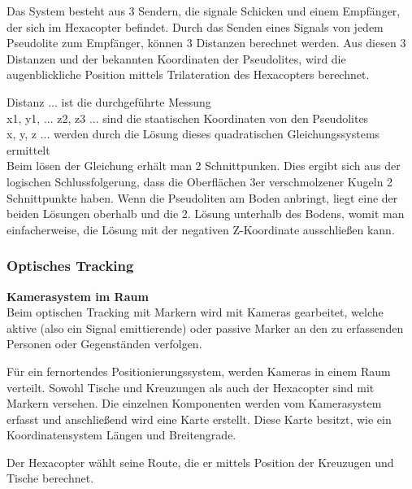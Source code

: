       Das System besteht aus 3 Sendern, die signale Schicken und einem Empfänger, der sich im Hexacopter befindet.
      Durch das Senden eines Signals von jedem Pseudolite zum Empfänger, können 3 Distanzen berechnet werden.
      Aus diesen 3 Distanzen und der bekannten Koordinaten der Pseudolites, wird die augenblickliche Position mittels Trilateration des Hexacopters berechnet.


      Distanz ... ist die durchgeführte Messung\\
      x1, y1, ... z2, z3 ... sind die staatischen Koordinaten von den Pseudolites \\
      x, y, z ... werden durch die Lösung dieses quadratischen Gleichungssystems ermittelt \\

      Beim lösen der Gleichung erhält man 2 Schnittpunken. Dies ergibt sich aus der logischen Schlussfolgerung, dass die Oberflächen 3er verschmolzener Kugeln 2 Schnittpunkte haben.
      Wenn die Pseudoliten am Boden anbringt, liegt eine der beiden Lösungen oberhalb und die 2. Lösung unterhalb des Bodens, womit man einfacherweise, die Lösung mit der negativen Z-Koordinate ausschließen kann.

    \subsubsection{Optisches Tracking}

  \textbf{Kamerasystem im Raum}\\

  Beim optischen Tracking mit Markern wird mit Kameras gearbeitet, welche aktive (also ein Signal emittierende) oder passive Marker an den zu erfassenden Personen oder Gegenständen verfolgen.

  Für ein fernortendes Positionierungssystem, werden Kameras in einem Raum verteilt.
  Sowohl Tische und Kreuzungen als auch der Hexacopter sind mit Markern versehen. Die einzelnen Komponenten werden vom Kamerasystem erfasst und anschließend wird eine Karte erstellt. Diese Karte besitzt, wie ein Koordinatensystem Längen und Breitengrade.

  Der Hexacopter wählt seine Route, die er mittels Position der Kreuzugen und Tische berechnet.

